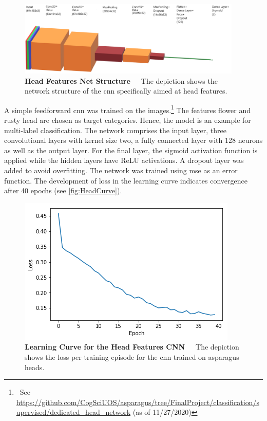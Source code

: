 \begin{figure}[!htb]
	\centering
	\includegraphics[width=0.95\textwidth]{Figures/chapter04/head_net_structure.png}
	\decoRule
	\caption[Head Features Net Structure]{\textbf{Head Features Net Structure}~~~The depiction shows the network structure of the \acrshort{cnn} specifically aimed at head features.}
	\label{fig:HeadNetStructure}
\end{figure}

\bigskip
A simple feedforward \acrshort{cnn} was trained on the images.\footnote{~See \url{https://github.com/CogSciUOS/asparagus/tree/FinalProject/classification/supervised/dedicated\_head\_network} (as of 11/27/2020)} The features flower and rusty head are chosen as target categories. Hence, the  model is an example for multi-label classification. The network comprises the input layer, three convolutional layers with kernel size two, a fully connected layer with 128 neurons as well as the output layer. For the final layer, the sigmoid activation function is applied while the hidden layers have ReLU activations. A dropout layer was added to avoid overfitting. The network was trained using \acrfull{mse} as an error function. The development of loss in the learning curve indicates convergence after 40 epochs (see \autoref{fig:HeadCurve}).

\begin{figure}[!htb]
	\centering
	\includegraphics[scale=1.8]{Figures/chapter04/head_curve.png}
	\decoRule
	\caption[Head Features CNN Learning Curve]{\textbf{Learning Curve for the Head Features CNN}~~~The depiction shows the loss per training episode for the \acrshort{cnn} trained on asparagus heads.}
	\label{fig:HeadCurve}
\end{figure}	

